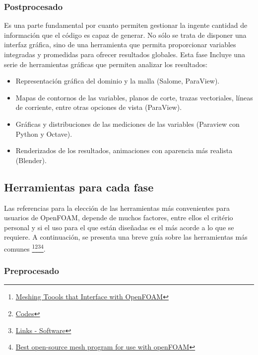 \subsubsection{Postprocesado}

Es una parte fundamental por cuanto permiten gestionar la ingente
cantidad de información que el código es capaz de generar. No sólo se
trata de disponer una interfaz gráfica, sino de una herramienta que
permita proporcionar variables integradas y promedidas para ofrecer
resultados globales. Esta fase Incluye una serie de herramientas
gráficas que permiten analizar los resultados:

\begin{itemize}
\item
  Representación gráfica del dominio y la malla (Salome, ParaView).
\item
  Mapas de contornos de las variables, planos de corte, trazas
  vectoriales, líneas de corriente, entre otras opciones de vista
  (ParaView).
\item
  Gráficas y distribuciones de las mediciones de las variables
  (Paraview con Python y Octave).
\item
  Renderizados de los resultados, animaciones con aparencia más
  realista (Blender).
\end{itemize}

\subsection{Herramientas para cada fase}\label{header-n52}

Las referencias para la elección de las herramientas más convenientes
para usuarios de OpenFOAM, depende de muchos factores, entre ellos el
critério personal y si el uso para el que están diseñadas es el más
acorde a lo que se requiere. A continuación, se presenta una breve guía
sobre las herramientas más comunes \footnote{\href{https://github.com/NanoSim/CoursesAndTrainingPortfolio/blob/master/3_EulerianModels/meshingTools.md}{Meshing
  Toools that Interface with OpenFOAM}}\footnote{\href{https://www.cfd-online.com/Wiki/Codes}{Codes}}\footnote{\href{https://www.cfd-online.com/Links/soft.html}{Links - Software}}\footnote{\href{https://www.reddit.com/r/CFD/comments/18ydig/best_opensource_mesh_program_for_use_with_openfoam/}{Best
  open-source mesh program for use with openFOAM}}.

\subsubsection{Preprocesado}\label{header-n68}

